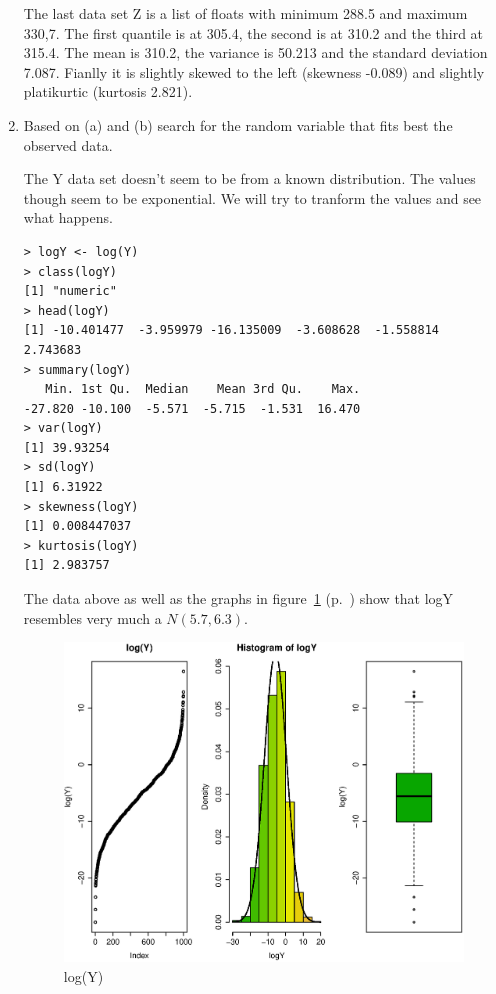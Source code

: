 \documentclass{article}
\begin{document}
\begin{enumerate}
  The last data set Z is a list of floats with minimum 288.5 and maximum 330,7.
  The first quantile is at 305.4, the second is at 310.2 and the third at 315.4.
  The mean is 310.2, the variance is 50.213 and the standard deviation 7.087.
  Fianlly it is slightly skewed to the left (skewness -0.089) and slightly
  platikurtic (kurtosis 2.821).
  
  \item Based on (a) and (b) search for the random variable that fits best the
  observed data.
  
  The Y data set doesn't seem to be from a known distribution. The values though
  seem to be exponential. We will try to tranform the values and see what
  happens.
  
  \begin{lstlisting}
> logY <- log(Y)
> class(logY)
[1] "numeric"
> head(logY)
[1] -10.401477  -3.959979 -16.135009  -3.608628  -1.558814   2.743683
> summary(logY)
   Min. 1st Qu.  Median    Mean 3rd Qu.    Max. 
-27.820 -10.100  -5.571  -5.715  -1.531  16.470 
> var(logY)
[1] 39.93254
> sd(logY)
[1] 6.31922
> skewness(logY)
[1] 0.008447037
> kurtosis(logY)
[1] 2.983757
  \end{lstlisting}
  
  The data above as well as the graphs in figure~\ref{fig:logy}
  (p.~\pageref{fig:logy}) show that logY resembles very much a $N(5.7,6.3)$.
  
  \begin{figure}[H]
  \centering
  \includegraphics[scale=0.6]{logy.eps}
  \caption{log(Y)}
  \label{fig:logy}
  \end{figure}
  

\end{enumerate}
\end{document}
